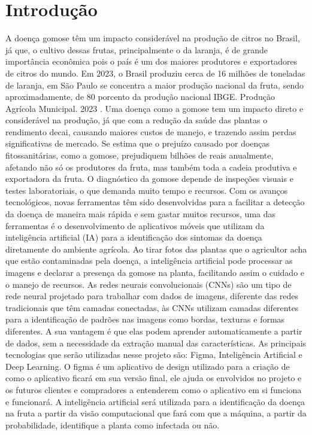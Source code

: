 \documentclass[
  a4paper,%
  12pt,%
  english,%
  brazilian,%
]{article}
\begin{document}
\section*{Introdução}
A doença gomose têm um impacto considerável na produção de citros no Brasil, já que, o cultivo dessas frutas, principalmente o da laranja, é de grande importância econômica pois o país é um dos maiores produtores e exportadores de citros do mundo. Em 2023, o Brasil produziu cerca de 16 milhões de toneladas de laranja, em São Paulo se concentra a maior produção nacional da fruta, sendo aproximadamente, de 80 porcento da produção nacional IBGE. Produção Agrícola Municipal. 2023 \cite{IBGE2024}. Uma doença como a gomose tem um impacto direto e considerável na produção, já que com a redução da saúde das plantas o rendimento decai, causando maiores custos de manejo, e trazendo assim perdas significativas de mercado. Se estima que o prejuízo causado por doenças fitossanitárias, como a gomose, prejudiquem bilhões de reais anualmente, afetando não só os produtores da fruta, mas também toda a cadeia produtiva e exportadora da fruta.
O diagnóstico da gomose depende de inspeções visuais e testes laboratoriais, o que demanda muito tempo e recursos. Com os avanços tecnológicos, novas ferramentas têm sido desenvolvidas para a facilitar a detecção da doença de maneira mais rápida e sem gastar muitos recursos, uma das ferramentas é o desenvolvimento de aplicativos móveis que utilizam da inteligência artificial (IA) para a identificação dos sintomas da doença diretamente do ambiente agrícola. Ao tirar fotos das plantas que o agricultor acha que estão contaminadas pela doença, a inteligência artificial pode processar as imagens e declarar a presença da gomose na planta, facilitando assim o cuidado e o manejo de recursos.
As redes neurais convolucionais (CNNs) são um tipo de rede neural projetado para trabalhar com dados de imagens, diferente das redes tradicionais que têm camadas conectadas, às CNNs utilizam camadas diferentes para a identificação de padrões nas imagens como bordas, texturas e formas diferentes. A sua vantagem é que elas podem aprender automaticamente a partir de dados, sem a necessidade da extração manual das características.
As principais tecnologias que serão utilizadas nesse projeto são: Figma, Inteligência Artificial e Deep Learning. O figma é um aplicativo de design utilizado para a criação de como o aplicativo ficará em sua versão final, ele ajuda os envolvidos no projeto e os futuros clientes e compradores a entenderem como o aplicativo em si funciona e funcionará. A inteligência artificial será utilizada para a identificação da doença na fruta a partir da visão computacional que fará com que a máquina, a partir da probabilidade, identifique a planta como infectada ou não. 
\label{sect:intro}

\end{document}
